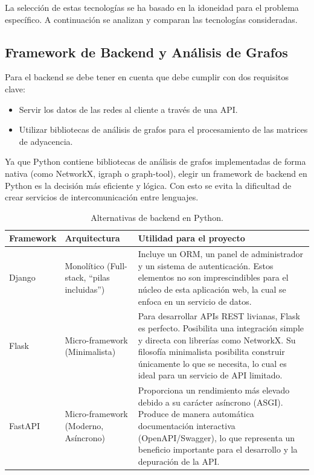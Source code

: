 La selección de estas tecnologías se ha basado en la idoneidad para el problema específico.
A continuación se analizan y comparan las tecnologías consideradas.

\subsection{Framework de Backend y Análisis de Grafos}

Para el backend se debe tener en cuenta que debe cumplir con dos requisitos clave:

\begin{itemize}
	\item Servir los datos de las redes al cliente a través de una API.
	\item Utilizar bibliotecas de análisis de grafos para el procesamiento de las matrices de
		adyacencia.
\end{itemize}

Ya que Python contiene bibliotecas de análisis de grafos implementadas de forma nativa
(como NetworkX, igraph o graph-tool), elegir un framework de backend en Python es la
decisión más eficiente y lógica. Con esto se evita la dificultad de crear servicios de
intercomunicación entre lenguajes.

\begin{table}[H]
	\centering
	\caption{Alternativas de backend en Python.}
	\small
	\begin{tabularx}{\textwidth}{>{\raggedright\arraybackslash}p{1.8cm} >{\raggedright\arraybackslash}p{3.2cm} >{\raggedright\arraybackslash}X}
		\toprule
		\textbf{Framework} & \textbf{Arquitectura} & \textbf{Utilidad para el proyecto} \\
		\midrule
		Django & Monolítico (Full-stack, ``pilas incluidas'') &
			Incluye un ORM, un panel de administrador y un sistema de autenticación.
			Estos elementos no son imprescindibles para el núcleo de esta aplicación web,
			la cual se enfoca en un servicio de datos. \\
		\addlinespace
		Flask & Micro-framework (Minimalista) &
			Para desarrollar APIs REST livianas, Flask es perfecto. Posibilita una
			integración simple y directa con librerías como NetworkX. Su filosofía
			minimalista posibilita construir únicamente lo que se necesita, lo cual es
			ideal para un servicio de API limitado. \\
		\addlinespace
		FastAPI & Micro-framework (Moderno, Asíncrono) &
			Proporciona un rendimiento más elevado debido a su carácter asíncrono
			(ASGI). Produce de manera automática documentación interactiva
			(OpenAPI/Swagger), lo que representa un beneficio importante para el
			desarrollo y la depuración de la API. \\
		\bottomrule
	\end{tabularx}
\end{table}

